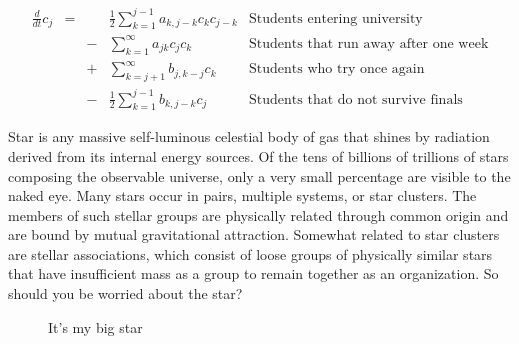 \documentclass[final]{beamer}
\begin{document}
\begin{frame}
\begin{multicols}{3}
\noindent
\colorbox{marronrp3}{
  \begin{minipage}[t]{.96\linewidth}
    \Large
    \begin{align*}
      \frac{d}{dt} c_j
      & = &&  \frac{1}{2} \sum_{k=1}^{j-1} a_{k,j-k}  c_k c_{j-k}
      &  \text{Students entering university}\\
      && - &\sum_{k=1}^{\infty} a_{jk} c_j c_k
      &   \text{Students that run away after one week}\\
      && + &\sum_{k=j+1}^{\infty} b_{j,k-j} c_k
      &   \text{Students who try once again}\\
      && - &\frac{1}{2} \sum_{k=1}^{j-1} b_{k,j-k} c_j
      & \text{Students that do not survive finals}
    \end{align*}
    \vspace{.02cm}
  \end{minipage}
}

\vspace{.3cm}
\columnbreak
Star is any massive self-luminous celestial body of gas that shines by radiation derived from its internal energy sources.
Of the tens of billions of trillions of stars composing the observable universe, only a very small percentage are visible to the naked eye.
Many stars occur in pairs, multiple systems, or star clusters.
The members of such stellar groups are physically related through common origin and are bound by mutual gravitational attraction.
Somewhat related to star clusters are stellar associations,
which consist of loose groups of physically similar stars that have insufficient mass as a group to remain together as an organization.
So should you be worried about the star?

\begin{figure}
   \centering
   \caption{It's my big star}

\end{figure}


\end{multicols}
\end{frame}
\end{document}
